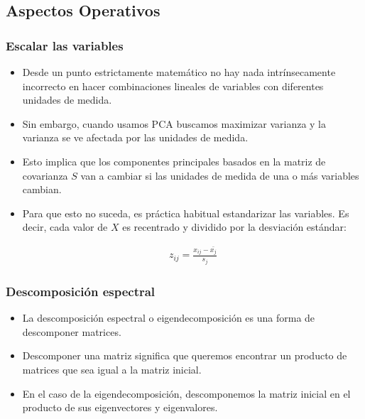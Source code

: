 \documentclass[
  shownotes,
  xcolor={svgnames},
  hyperref={colorlinks,citecolor=DarkBlue,linkcolor=DarkRed,urlcolor=DarkBlue}
  , aspectratio=169]{beamer}
\begin{document}
\subsection{Aspectos Operativos}
\begin{frame}
\frametitle{Escalar las variables}



\begin{itemize}
 \item  Desde un punto estrictamente matemático no hay nada intrínsecamente incorrecto en hacer combinaciones lineales de variables con diferentes unidades de medida. 
\medskip
 \item Sin embargo, cuando usamos PCA buscamos maximizar varianza y la varianza se ve
afectada por las unidades de medida.

\item  Esto implica que los componentes principales basados en la matriz de covarianza \(S\) van a cambiar si las unidades de medida de una o más variables cambian. 
\item Para que esto no suceda, es práctica habitual estandarizar las variables. Es decir, cada
valor de \(X\) es recentrado y dividido por la desviación estándar:

\begin{align}
  z_{ij} = \frac{x_{ij}-\bar{x_j}}{s_j}
\end{align}

 \end{itemize}

\end{frame}
\begin{frame}
\frametitle{Descomposición espectral}


\begin{itemize}


\item La descomposición espectral o eigendecomposición es una forma de descomponer matrices. 
\medskip
\item Descomponer una matriz significa que queremos encontrar un producto de matrices que sea igual a la matriz inicial. 
\medskip
\item En el caso de la eigendecomposición, descomponemos la matriz inicial en el producto de sus eigenvectores y eigenvalores.


 \end{itemize}

\end{frame}
\end{document}
